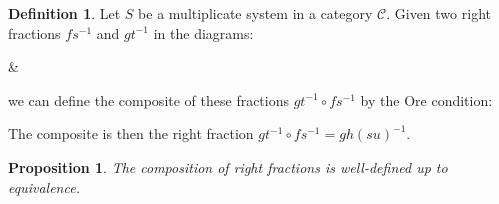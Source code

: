 \documentclass[12pt]{article}
\newtheorem{prop}[theorem]{Proposition}
\theoremstyle{definition}
\newtheorem{definition}{Definition}[section]
\theoremstyle{remark}
\begin{document}
            \begin{definition}
                Let $S$ be a multiplicate system in a category $\mathcal{C}$. Given two right fractions $fs^{-1}$ and $gt^{-1}$ in the diagrams:
                \begin{center}
                    \&
                \end{center}
                we can define the composite of these fractions $gt^{-1}\circ fs^{-1}$ by the Ore condition:
                \begin{center}
                \end{center}
                The composite is then the right fraction $gt^{-1}\circ fs^{-1} = gh(su)^{-1}$.
            \end{definition}

            \begin{prop}
                The composition of right fractions is well-defined up to equivalence.
            \end{prop}
\end{document}
